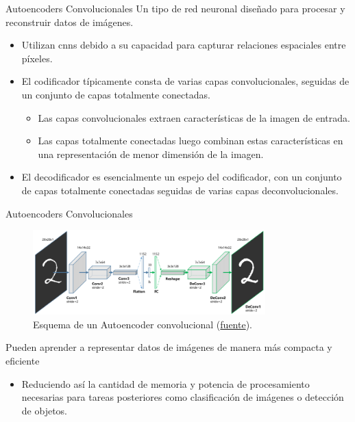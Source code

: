 \begin{frame}{Autoencoders Convolucionales}
Un tipo de red neuronal diseñado para procesar y reconstruir datos de imágenes.

\begin{itemize}
    \item Utilizan \glspl{cnn} debido a su capacidad para capturar relaciones espaciales entre píxeles.
    \item El codificador típicamente consta de varias capas convolucionales, seguidas de un conjunto de capas totalmente conectadas.
    \begin{itemize}
        \item Las capas convolucionales extraen características de la imagen de entrada.
        \item Las capas totalmente conectadas luego combinan estas características en una representación de menor dimensión de la imagen.
    \end{itemize}
    \item El decodificador es esencialmente un espejo del codificador, con un conjunto de capas totalmente conectadas seguidas de varias capas deconvolucionales.
\end{itemize}
\end{frame}

\begin{frame}{Autoencoders Convolucionales}

\begin{figure}
    \centering
    \includegraphics[width=0.8\textwidth]{Slides/figures/02_Metodos_Generativos/2.2. ae conv.png}
    \caption{Esquema de un Autoencoder convolucional (\href{https://www.researchgate.net/profile/Xifeng-Guo/publication/320658590/figure/fig1/AS:614154637418504@1523437284408/The-structure-of-proposed-Convolutional-AutoEncoders-CAE-for-MNIST-In-the-middle-there.png}{fuente}).}
\end{figure}

Pueden aprender a representar datos de imágenes de manera más compacta y eficiente

\begin{itemize}
    \item Reduciendo así la cantidad de memoria y potencia de procesamiento necesarias para tareas posteriores como clasificación de imágenes o detección de objetos.
\end{itemize}
\end{frame}


